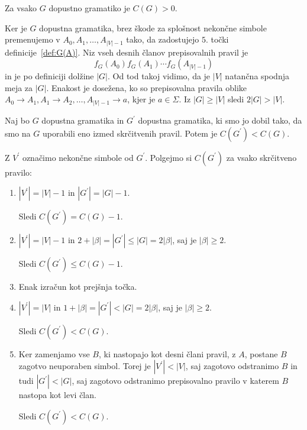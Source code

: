 \documentclass[fin1, tisk]{fmfdelo}
\providecommand{\abs}[1]{\left\lvert #1 \right\rvert}
\theoremstyle{definition}
\begin{document}
\begin{trditev}\label{trditev:C}
    Za vsako $G$ dopustno gramatiko je $C(G) > 0$.
\end{trditev}

\begin{dokaz}
    Ker je $G$ dopustna gramatika, brez škode za splošnost nekončne simbole premenujemo v 
    $A_0, A_1, \ldots, A_{\abs{V}-1}$ tako, da zadostujejo $5.$ točki definicije~\ref{def:G(A)}.
    Niz vseh desnih članov prepisovalnih pravil je
    \[
        f_G(A_0)f_G(A_1) \cdots f_G(A_{\abs{V}-1})
    \]
    in je po definiciji dolžine $\abs{G}$.
    Od tod takoj vidimo, da je $\abs{V}$ natančna spodnja meja za $\abs{G}$. Enakost je dosežena,
    ko so prepisovalna pravila oblike 
    $ A_0 \rightarrow A_1, A_1 \rightarrow A_2, \ldots, A_{\abs{V}-1} \rightarrow a$,
    kjer je $a \in \Sigma$.
    Iz $\abs{G} \geq \abs{V}$ sledi $2 \abs{G} > \abs{V}$.
\end{dokaz}

\begin{trditev}\label{trditev:Skrčitev}
    Naj bo $G$ dopustna gramatika in $G^\prime$ dopustna gramatika, ki smo jo dobil tako, da smo
    na $G$ uporabili eno izmed skrčitvenih pravil. Potem je $C(G^\prime) < C(G)$. 
\end{trditev}

\begin{dokaz}
    Z $V^\prime$ označimo nekončne simbole od $G^\prime$. Polgejmo si $C(G^\prime)$ za vsako 
    skrčitveno pravilo:
    \begin{enumerate}
        \item $\abs{V^\prime} = \abs{V} -1$ in $\abs{G^\prime} = \abs{G} - 1$. 
        
        Sledi $C(G^\prime) = C(G) - 1$.
        \item $\abs{V^\prime} = \abs{V} -1$ in 
        $2 + \abs{\beta} =\abs{G^\prime} \leq \abs{G} = 2 \abs{\beta}$, saj je $\abs{\beta} \geq 2$.
        
        Sledi $C(G^\prime) \leq C(G) - 1$.
        \item Enak izračun kot prejšnja točka.
        \item $\abs{V^\prime} = \abs{V}$ in 
        $ 1 + \abs{\beta} = \abs{G^\prime} < \abs{G} = 2 \abs{\beta}$, saj je $\abs{\beta} \geq 2$.
        
        Sledi $C(G^\prime) < C(G)$.
        \item Ker zamenjamo vse $B$, ki nastopajo kot desni člani pravil, z $A$, postane $B$
        zagotvo neuporaben simbol. Torej je $\abs{V^\prime} < \abs{V}$, saj zagotovo odstranimo $B$
        in tudi $\abs{G^\prime} < \abs{G}$, saj zagotovo odstranimo prepisovalno pravilo v katerem
        $B$ nastopa kot levi član.

        Sledi $C(G^\prime) < C(G)$.
    \end{enumerate}
\end{dokaz}
\end{document}

